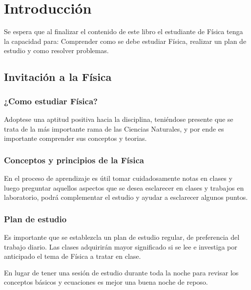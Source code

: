 \documentclass[a5paper,pagesize,10pt,bibtotoc,pointlessnumbers,
normalheadings,DIV=9,fleqn,x11names,table,twoside=false]{scrbook}
\begin{document}
\tableofcontents 
\cleardoublepage  %
\chapter*{Introducción}

Se espera que al finalizar el contenido de este libro el estudiante de Física tenga la capacidad para: Comprender como se debe 
estudiar Física, realizar un plan de estudio y como resolver problemas.

\section*{Invitación a la Física}

\vspace{1.0cm}

\subsection*{¿Como estudiar Física?} 

Adoptese una aptitud positiva hacia la disciplina, teniéndose presente que se trata de la más importante rama de las Ciencias 
Naturales, y por ende es importante comprender sus conceptos y teorias.

\subsection*{Conceptos y principios de la Física}

En el proceso de aprendizaje es útil tomar cuidadosamente notas en clases y luego preguntar aquellos aspectos que se desea 
esclarecer en clases y trabajos en laboratorio, podrá complementar el estudio y ayudar a esclarecer algunos puntos.

\subsection*{Plan de estudio}

Es importante que se establezcla un plan de estudio regular, de preferencia del trabajo diario. Las clases adquirirán mayor 
significado si se lee e investiga por anticipado el tema de Física a tratar en clase.\\

\begin{tcolorbox}
En lugar de tener una sesión de estudio durante toda la noche para revisar los conceptos básicos y ecuaciones es mejor una buena 
noche de reposo.
\end{tcolorbox}
\end{document}
